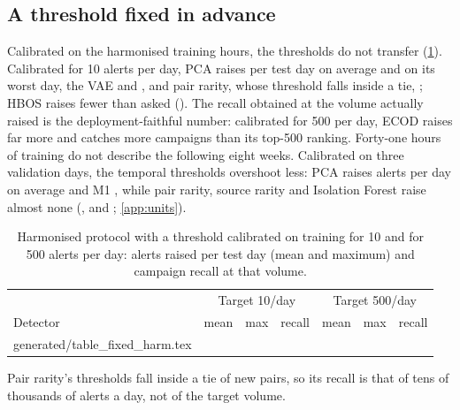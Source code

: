 \documentclass[11pt,a4paper]{article}
\makeatletter
\newcommand{\tablerows}[1]{\@@input #1 }
\makeatother
\begin{document}
\subsection{A threshold fixed in advance}
\label{sec:fixed-results}
Calibrated on the harmonised training hours, the thresholds do not transfer (\cref{tab:fixed}). Calibrated for 10 alerts per day, PCA raises \HarmPcaFixedTenMean{} per test day on average and \HarmPcaFixedTenMax{} on its worst day, the VAE \HarmVaeFixedTenMean{} and \HarmVaeFixedTenMax{}, and pair rarity, whose threshold falls inside a tie, \HarmPairRarityFixedTenMean{}; HBOS raises fewer than asked (\HarmHbosFixedTenMean{}). The recall obtained at the volume actually raised is the deployment-faithful number: calibrated for 500 per day, ECOD raises far more and catches more campaigns than its top-500 ranking. Forty-one hours of training do not describe the following eight weeks. Calibrated on three validation days, the temporal thresholds overshoot less: PCA raises \TempPcaFixedTenMean{} alerts per day on average and M1 \TempRulesFixedTenMean{}, while pair rarity, source rarity and Isolation Forest raise almost none (\TempPairRarityFixedTenMean{}, \TempSourceRarityFixedTenMean{} and \TempIForestFixedTenMean{}; \cref{app:units}).

\begin{table}[t]
\centering
\footnotesize
\begin{threeparttable}
\caption{Harmonised protocol with a threshold calibrated on training for 10 and for 500 alerts per day: alerts raised per test day (mean and maximum) and campaign recall at that volume.}
\label{tab:fixed}
\begin{tabular}{@{}lrrrrrr@{}}
\toprule
& \multicolumn{3}{c}{Target 10/day} & \multicolumn{3}{c}{Target 500/day} \\
Detector & mean & max & recall & mean & max & recall \\
\midrule
\tablerows{generated/table_fixed_harm.tex}
\bottomrule
\end{tabular}
\begin{tablenotes}\footnotesize
\item Pair rarity's thresholds fall inside a tie of new pairs, so its recall is that of tens of thousands of alerts a day, not of the target volume.
\end{tablenotes}
\end{threeparttable}
\end{table}
\end{document}
